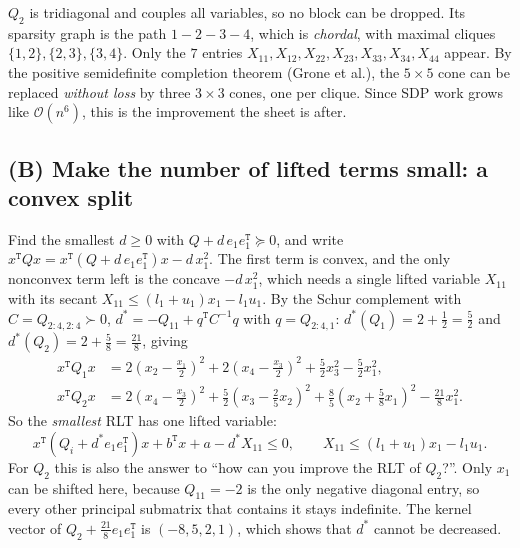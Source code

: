 \documentclass[11pt,fleqn]{article}
\newcommand{\trps}{^\texttt{T}}
\begin{document}
\textbf{$Q_2$} is tridiagonal and couples all variables, so no block can be dropped. Its
sparsity graph is the path $1-2-3-4$, which is \emph{chordal}, with maximal cliques
$\{1,2\}, \{2,3\}, \{3,4\}$. Only the $7$ entries
$X_{11},X_{12},X_{22},X_{23},X_{33},X_{34},X_{44}$ appear. By the positive semidefinite
completion theorem (Grone et al.), the $5\times5$ cone can be replaced \emph{without loss}
by three $3\times3$ cones, one per clique. Since SDP work grows like $\mathcal O(n^6)$, this
is the improvement the sheet is after.

\subsection*{(B) Make the number of lifted terms small: a convex split}

Find the smallest $d \ge 0$ with $Q + d\,e_1e_1\trps \succeq 0$, and write
$x\trps Q x = x\trps (Q + d\,e_1e_1\trps) x - d\,x_1^2$. The first term is convex, and the only
nonconvex term left is the concave $-d\,x_1^2$, which needs a single lifted variable
$X_{11}$ with its secant $X_{11} \le (l_1+u_1)x_1 - l_1u_1$. By the Schur complement with
$C = Q_{2:4,2:4} \succ 0$, $d^* = -Q_{11} + q\trps C^{-1} q$ with $q = Q_{2:4,1}$:
$d^*(Q_1) = 2 + \tfrac12 = \tfrac52$ and $d^*(Q_2) = 2 + \tfrac58 = \tfrac{21}{8}$, giving
\begin{align*}
  x\trps Q_1 x &= 2\left(x_2 - \tfrac{x_1}{2}\right)^2 + 2\left(x_4 - \tfrac{x_3}{2}\right)^2
                 + \tfrac52 x_3^2 - \tfrac52 x_1^2,\\
  x\trps Q_2 x &= 2\left(x_4 - \tfrac{x_3}{2}\right)^2 + \tfrac52\left(x_3 - \tfrac25 x_2\right)^2
               + \tfrac85\left(x_2 + \tfrac58 x_1\right)^2 - \tfrac{21}{8} x_1^2 .
\end{align*}
So the \emph{smallest} RLT has one lifted variable:
\[
  x\trps(Q_i + d^*e_1e_1\trps)x + b\trps x + a - d^* X_{11} \le 0, \qquad X_{11} \le (l_1+u_1)x_1 - l_1u_1 .
\]
For $Q_2$ this is also the answer to ``how can you improve the RLT of $Q_2$?''. Only $x_1$ can
be shifted here, because $Q_{11} = -2$ is the only negative diagonal entry, so every other
principal submatrix that contains it stays indefinite. The kernel vector of
$Q_2 + \tfrac{21}{8}e_1e_1\trps$ is $(-8,5,2,1)$, which shows that $d^*$ cannot be decreased.
\end{document}
